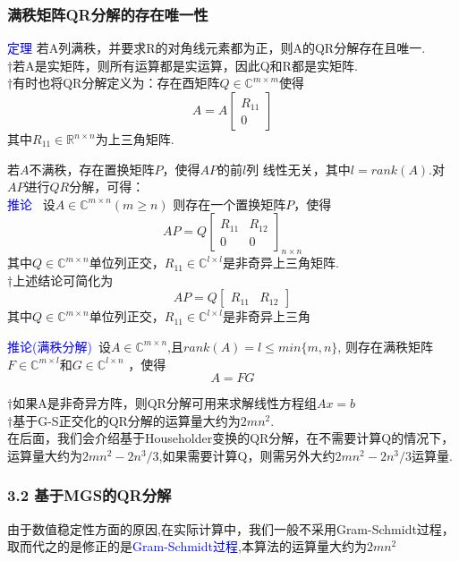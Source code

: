 \documentclass[notheorems,serif]{beamer}
\begin{document}
\begin{frame}
\frametitle{满秩矩阵QR分解的存在唯一性}
\textcolor{blue}{定理} 若A列满秩，并要求R的对角线元素都为正，则A的QR分解存在且唯一.\\

$\dagger$若A是实矩阵，则所有运算都是实运算，因此Q和R都是实矩阵.\\

$\dagger$有时也将QR分解定义为：存在酉矩阵$Q\in\mathbb{C}^{m\times m}$使得
\[
A = A\begin{bmatrix}R_{11}\\0\end{bmatrix}
\]
其中$R_{11}\in\mathbb{R}^{n\times n}$为上三角矩阵.
\end{frame}

\begin{frame}
若$A$不满秩，存在置换矩阵$P$，使得$AP$的前$l$列
线性无关，其中$l=rank(A)$.对$AP$进行$QR$分解，可得：\\
\textcolor{blue}{推论} ~设$A\in\mathbb{C}^{m\times n}(m\geq n)$ 则存在一个置换矩阵$P$，使得
\[
AP=Q\begin{bmatrix}R_{11}&R_{12}\\0&0\end{bmatrix}_{n\times n}
\]
其中$Q\in\mathbb{C}^{m\times n}$单位列正交，$R_{11}\in\mathbb{C}^{l\times l}$是非奇异上三角矩阵.\\
$\dagger$上述结论可简化为
\[
AP=Q\begin{bmatrix}R_{11}&R_{12}\end{bmatrix}
\]
其中$Q\in\mathbb{C}^{m\times n}$单位列正交，$R_{11}\in\mathbb{C}^{l\times l}$是非奇异上三角
\end{frame}

\begin{frame}
\textcolor{blue}{推论(满秩分解)}~设$A\in\mathbb{C}^{m\times n}$,且$rank(A)=l\le min\{m,n\}$, 则存在满秩矩阵$F\in\mathbb{C}^{m\times l}$和$G\in\mathbb{C}^{l\times n}$ ，使得
\[
A=FG
\]

$\dagger$如果A是非奇异方阵，则QR分解可用来求解线性方程组$Ax=b$\\

$\dagger$基于G-S正交化的QR分解的运算量大约为$2mn^{2}$.\\

在后面，我们会介绍基于Householder变换的QR分解，在不需要计算Q的情况下，运算量大约为$2mn^{2}-2n^{3}/3$,如果需要计算Q，则需另外大约$2mn^{2}-2n^{3}/3$运算量.
\end{frame}

\begin{frame}
\frametitle{3.2 基于MGS的QR分解}
由于数值稳定性方面的原因,在实际计算中，我们一般不采用Gram-Schmidt过程，取而代之的是修正的是\textcolor{blue}{Gram-Schmidt过程},本算法的运算量大约为$2mn^{2}$
\end{frame}
\end{document}
